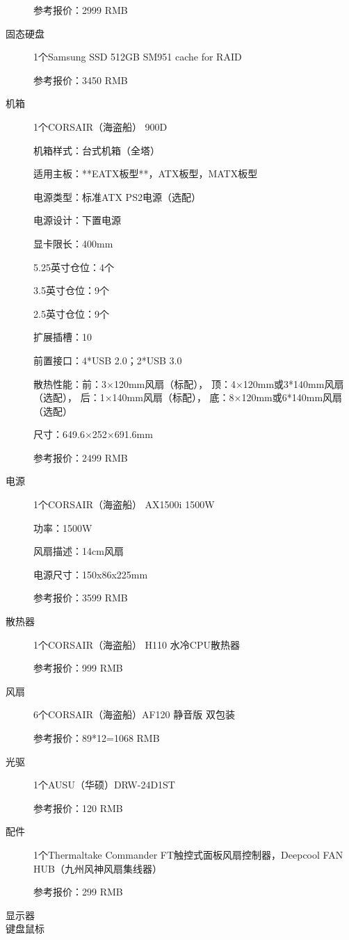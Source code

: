 \begin{description}
\begin{shaded}
{参考报价：2999 RMB} 
\end{shaded} 
\item[固态硬盘] 1个Samsung SSD 512GB SM951 cache for RAID
\begin{shaded}
\scriptsize{
参考报价：3450 RMB} 
\end{shaded} 
\item[机箱] 1个CORSAIR（海盗船） 900D
\begin{shaded}
\scriptsize{
机箱样式：台式机箱（全塔）

适用主板：**EATX板型**，ATX板型，MATX板型

电源类型：标准ATX PS2电源（选配）

电源设计：下置电源

显卡限长：400mm

5.25英寸仓位：4个

3.5英寸仓位：9个

2.5英寸仓位：9个

扩展插槽：10

前置接口：4*USB 2.0；2*USB 3.0

散热性能：前：3×120mm风扇（标配），
   	顶：4×120mm或3*140mm风扇（选配），
        后：1×140mm风扇（标配），
        底：8×120mm或6*140mm风扇（选配）

尺寸：649.6×252×691.6mm

参考报价：2499 RMB } 
\end{shaded} 
\item[电源] 1个CORSAIR（海盗船） AX1500i 1500W
\begin{shaded}
\scriptsize{
功率：1500W

风扇描述：14cm风扇

电源尺寸：150x86x225mm

参考报价：3599 RMB} 
\end{shaded} 
\item[散热器] 1个CORSAIR（海盗船） H110 水冷CPU散热器
\begin{shaded}
\scriptsize{
参考报价：999 RMB} 
\end{shaded} 
\item[风扇] 6个CORSAIR（海盗船）AF120 静音版 双包装
\begin{shaded}
\scriptsize{
参考报价：89*12=1068 RMB} 
\end{shaded} 
\item[光驱] 1个AUSU（华硕）DRW-24D1ST
\begin{shaded}
\scriptsize{
参考报价：120 RMB} 
\end{shaded} 
\item[配件] 1个Thermaltake Commander FT触控式面板风扇控制器，Deepcool FAN HUB（九州风神风扇集线器）
\begin{shaded}
\scriptsize{
参考报价：299 RMB} 
\end{shaded} 
\item[显示器]
\item[键盘鼠标]
\end{description}

